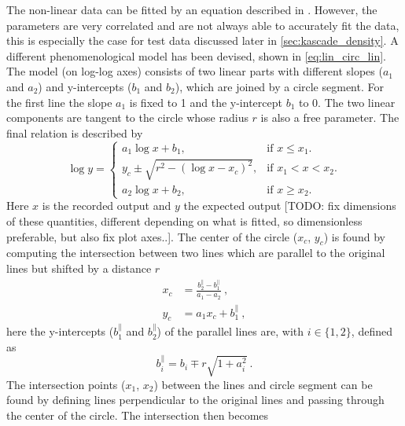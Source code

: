 The non-linear data can be fitted by an equation described in \cite{icecube2010pmt}. However, the parameters are very correlated and are not always able to accurately fit the data, this is especially the case for test data discussed later in \cref{sec:kascade_density}. A different phenomenological model has been devised, shown in \ref{eq:lin_circ_lin}. The model (on log-log axes) consists of two linear parts with different slopes ($a_1$ and $a_2$) and y-intercepts ($b_1$ and $b_2$), which are joined by a circle segment. For the first line the slope $a_1$ is fixed to 1 and the y-intercept $b_1$ to 0. The two linear components are tangent to the circle whose radius $r$ is also a free parameter. The final relation is described by
%
\begin{equation}
\label{eq:lin_circ_lin}
    \log y =
    \begin{cases}
        a_1 \log x + b_1,                     & \text{if $x \leq x_1$}.\\
        y_c \pm \sqrt{r^2 - \left(\log x - x_c\right)^2}, & \text{if $x_1 < x < x_2$}.\\
        a_2 \log x + b_2,                     & \text{if $x \geq x_2$}.
    \end{cases}
\end{equation}
%
Here $x$ is the recorded output and $y$ the expected output [TODO: fix dimensions of these quantities, different depending on what is fitted, so dimensionless preferable, but also fix plot axes..]. The center of the circle ($x_c$, $y_c$) is found by computing the intersection between two lines which are parallel to the original lines but shifted by a distance $r$
%
\begin{equation}
    \begin{aligned}
    x_c &= \frac{b^{\parallel}_2 - b^{\parallel}_1}{a_1 - a_2} \ ,\\
    y_c &= a_1 x_c + b^{\parallel}_1 \ ,
    \end{aligned}
\end{equation}
%
here the y-intercepts ($b^{\parallel}_1$ and $b^{\parallel}_2$) of the parallel lines are, with $i \in \{1, 2\}$, defined as
%
\begin{equation}
    b^{\parallel}_i = b_i \mp r \sqrt{1 + a_i^2} \ .
\end{equation}
%
The intersection points ($x_1$, $x_2$) between the lines and circle segment can be found by defining lines perpendicular to the original lines and passing through the center of the circle. The intersection then becomes

